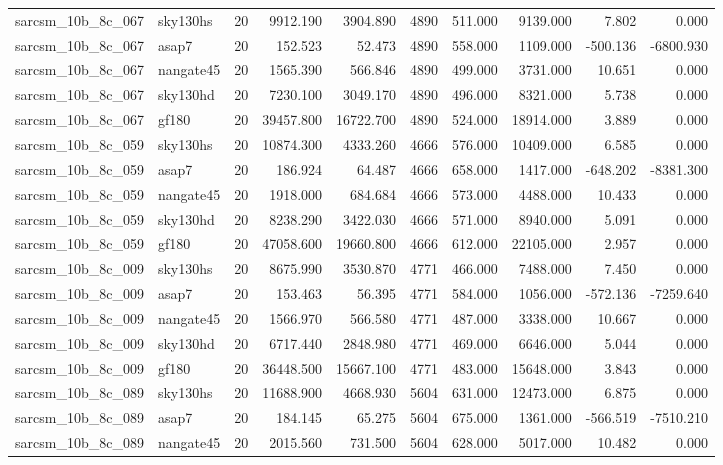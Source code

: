 \documentclass{article}
\begin{document}
\begin{longtable}{llrrrrrrrr}
sarcsm\_10b\_8c\_067 & sky130hs & 20 & 9912.190 & 3904.890 & 4890 & 511.000 & 9139.000 & 7.802 & 0.000 \\
sarcsm\_10b\_8c\_067 & asap7 & 20 & 152.523 & 52.473 & 4890 & 558.000 & 1109.000 & -500.136 & -6800.930 \\
sarcsm\_10b\_8c\_067 & nangate45 & 20 & 1565.390 & 566.846 & 4890 & 499.000 & 3731.000 & 10.651 & 0.000 \\
sarcsm\_10b\_8c\_067 & sky130hd & 20 & 7230.100 & 3049.170 & 4890 & 496.000 & 8321.000 & 5.738 & 0.000 \\
sarcsm\_10b\_8c\_067 & gf180 & 20 & 39457.800 & 16722.700 & 4890 & 524.000 & 18914.000 & 3.889 & 0.000 \\
sarcsm\_10b\_8c\_059 & sky130hs & 20 & 10874.300 & 4333.260 & 4666 & 576.000 & 10409.000 & 6.585 & 0.000 \\
sarcsm\_10b\_8c\_059 & asap7 & 20 & 186.924 & 64.487 & 4666 & 658.000 & 1417.000 & -648.202 & -8381.300 \\
sarcsm\_10b\_8c\_059 & nangate45 & 20 & 1918.000 & 684.684 & 4666 & 573.000 & 4488.000 & 10.433 & 0.000 \\
sarcsm\_10b\_8c\_059 & sky130hd & 20 & 8238.290 & 3422.030 & 4666 & 571.000 & 8940.000 & 5.091 & 0.000 \\
sarcsm\_10b\_8c\_059 & gf180 & 20 & 47058.600 & 19660.800 & 4666 & 612.000 & 22105.000 & 2.957 & 0.000 \\
sarcsm\_10b\_8c\_009 & sky130hs & 20 & 8675.990 & 3530.870 & 4771 & 466.000 & 7488.000 & 7.450 & 0.000 \\
sarcsm\_10b\_8c\_009 & asap7 & 20 & 153.463 & 56.395 & 4771 & 584.000 & 1056.000 & -572.136 & -7259.640 \\
sarcsm\_10b\_8c\_009 & nangate45 & 20 & 1566.970 & 566.580 & 4771 & 487.000 & 3338.000 & 10.667 & 0.000 \\
sarcsm\_10b\_8c\_009 & sky130hd & 20 & 6717.440 & 2848.980 & 4771 & 469.000 & 6646.000 & 5.044 & 0.000 \\
sarcsm\_10b\_8c\_009 & gf180 & 20 & 36448.500 & 15667.100 & 4771 & 483.000 & 15648.000 & 3.843 & 0.000 \\
sarcsm\_10b\_8c\_089 & sky130hs & 20 & 11688.900 & 4668.930 & 5604 & 631.000 & 12473.000 & 6.875 & 0.000 \\
sarcsm\_10b\_8c\_089 & asap7 & 20 & 184.145 & 65.275 & 5604 & 675.000 & 1361.000 & -566.519 & -7510.210 \\
sarcsm\_10b\_8c\_089 & nangate45 & 20 & 2015.560 & 731.500 & 5604 & 628.000 & 5017.000 & 10.482 & 0.000 \\

\end{longtable}
\end{document}
